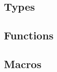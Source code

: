 \def\Subsection#1{\subsection{#1}}

\Subsection{Types}

\Subsection{Functions}

\enlargethispage*{\baselineskip}
\enlargethispage*{\baselineskip}
\enlargethispage*{\baselineskip}

\Subsection{Macros}

\pagebreak
